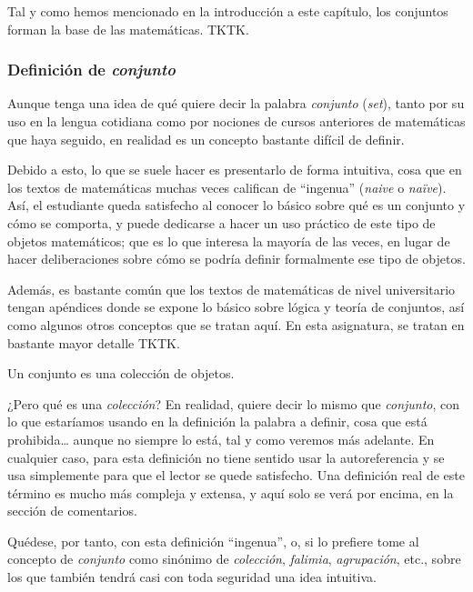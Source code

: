 


Tal y como hemos mencionado en la introducción a este capítulo, los
conjuntos forman la base de las matemáticas. TKTK.





\subsubsection{Definición de \emph{conjunto}}

Aunque tenga una idea de qué quiere decir la palabra \emph{conjunto}
(\emph{set}), tanto por su uso en la lengua cotidiana como por nociones de
cursos anteriores de matemáticas que haya seguido, en realidad es un
concepto bastante difícil de definir.

Debido a esto, lo que se suele hacer es presentarlo de forma intuitiva, cosa
que en los textos de matemáticas muchas veces califican de ``ingenua''
(\emph{naive} o \emph{naïve}). Así, el estudiante queda satisfecho al
conocer lo básico sobre qué es un conjunto y cómo se comporta, y puede
dedicarse a hacer un uso práctico de este tipo de objetos matemáticos; que
es lo que interesa la mayoría de las veces, en lugar de hacer deliberaciones
sobre cómo se podría definir formalmente ese tipo de objetos.


Además, es bastante común que los textos de matemáticas de nivel
universitario tengan apéndices donde se expone lo básico sobre lógica y
teoría de conjuntos, así como algunos otros conceptos que se tratan aquí. En
esta asignatura, se tratan en bastante mayor detalle TKTK.

\begin{deffinition}
  Un conjunto es una colección de objetos.
\end{deffinition}

\noindent ¿Pero qué es una \emph{colección}? En realidad, quiere decir lo
mismo que \emph{conjunto}, con lo que estaríamos usando en la definición la
palabra a definir, cosa que está prohibida\dots{} aunque no siempre lo está,
tal y como veremos más adelante. En cualquier caso, para esta definición no
tiene sentido usar la autoreferencia y se usa simplemente para que el lector
se quede satisfecho. Una definición real de este término es mucho más
compleja y extensa, y aquí solo se verá por encima, en la sección de
comentarios.

Quédese, por tanto, con esta definición ``ingenua'', o, si lo prefiere tome
al concepto de \emph{conjunto} como sinónimo de \emph{colección},
\emph{falimia}, \emph{agrupación}, etc., sobre los que también tendrá casi
con toda seguridad una idea intuitiva.

